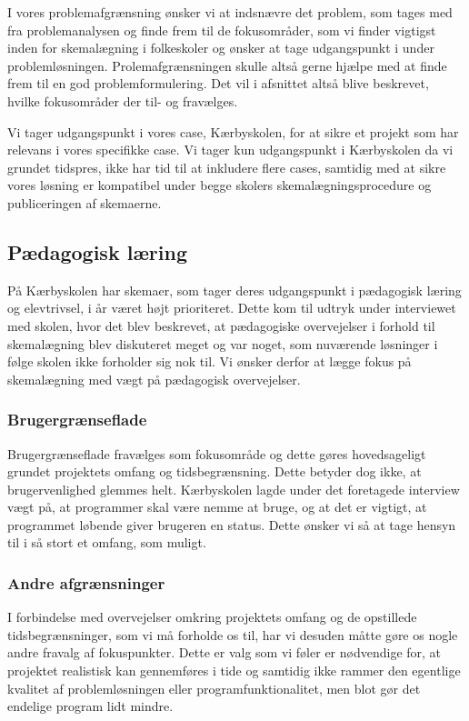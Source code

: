 \label{afg}
I vores problemafgrænsning ønsker vi at indsnævre det problem, som tages med fra problemanalysen og finde frem til de fokusområder, som vi finder vigtigst inden for skemalægning i folkeskoler og ønsker at tage udgangspunkt i under problemløsningen. Prolemafgrænsningen skulle altså gerne hjælpe med at finde frem til en god problemformulering. Det vil i afsnittet altså blive beskrevet, hvilke fokusområder der til- og fravælges.

Vi tager udgangspunkt i vores case, Kærbyskolen, for at sikre et projekt som har relevans i vores specifikke case. Vi tager kun udgangspunkt i Kærbyskolen da vi grundet tidspres, ikke har tid til at inkludere flere cases, samtidig med at sikre vores løsning er kompatibel under begge skolers skemalægningsprocedure og publiceringen af skemaerne. 

\subsection*{Pædagogisk læring}
På Kærbyskolen har skemaer, som tager deres udgangspunkt i pædagogisk læring og elevtrivsel, i år været højt prioriteret. Dette kom til udtryk under interviewet med skolen, hvor det blev beskrevet, at pædagogiske overvejelser i forhold til skemalægning blev diskuteret meget og var noget, som nuværende løsninger i følge skolen ikke forholder sig nok til. Vi ønsker derfor at lægge fokus på skemalægning med vægt på pædagogisk overvejelser.

\subsubsection*{Brugergrænseflade}
Brugergrænseflade fravælges som fokusområde og dette gøres hovedsageligt grundet projektets omfang og tidsbegrænsning. Dette betyder dog ikke, at brugervenlighed glemmes helt. Kærbyskolen lagde under det foretagede interview vægt på, at programmer skal være nemme at bruge, og at det er vigtigt, at programmet løbende giver brugeren en status. Dette ønsker vi så at tage hensyn til i så stort et omfang, som muligt.

\subsubsection*{Andre afgrænsninger}
I forbindelse med overvejelser omkring projektets omfang og de opstillede tidsbegrænsninger, som vi må forholde os til, har vi desuden måtte gøre os nogle andre fravalg af fokuspunkter. Dette er valg som vi føler er nødvendige for, at projektet realistisk kan gennemføres i tide og samtidig ikke rammer den egentlige kvalitet af problemløsningen eller programfunktionalitet, men blot gør det endelige program lidt mindre.

